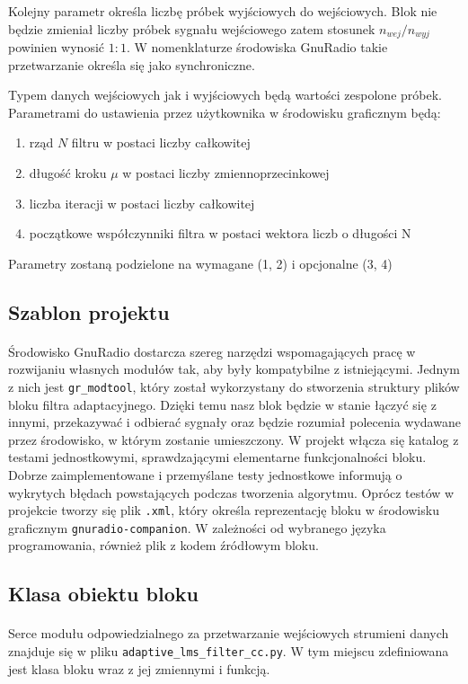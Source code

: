 Kolejny parametr określa liczbę próbek wyjściowych do wejściowych.
Blok nie będzie zmieniał liczby próbek sygnału wejściowego zatem stosunek $n_{wej}/n_{wyj}$
powinien wynosić $1:1$. W nomenklaturze środowiska GnuRadio takie przetwarzanie określa się jako synchroniczne.

Typem danych wejściowych jak i wyjściowych będą wartości zespolone próbek.
Parametrami do ustawienia przez użytkownika w środowisku graficznym będą:
\begin{enumerate}
 \item rząd $N$ filtru w postaci liczby całkowitej 
 \item długość kroku $\mu$ w postaci liczby zmiennoprzecinkowej
 \item liczba iteracji w postaci liczby całkowitej
 \item początkowe współczynniki filtra w postaci wektora liczb o długości N 
 \end{enumerate}
 
Parametry zostaną podzielone na wymagane (1, 2) i opcjonalne (3, 4)
\subsection{Szablon projektu}
\paragraph{}
Środowisko GnuRadio dostarcza szereg narzędzi wspomagających pracę w rozwijaniu własnych modułów tak, aby były kompatybilne z istniejącymi. 
Jednym z nich jest \texttt{gr\_modtool}, który został wykorzystany do stworzenia struktury plików bloku filtra adaptacyjnego. 
Dzięki temu nasz blok będzie w stanie łączyć się z innymi, przekazywać i odbierać sygnały oraz będzie rozumiał polecenia wydawane przez środowisko, w którym zostanie umieszczony. 
W projekt włącza się katalog z testami jednostkowymi, sprawdzającymi elementarne funkcjonalności bloku. 
Dobrze zaimplementowane i przemyślane testy jednostkowe informują o wykrytych błędach powstających podczas tworzenia algorytmu.
Oprócz testów w projekcie tworzy się plik \texttt{.xml}, który określa reprezentację bloku w środowisku graficznym \texttt{gnuradio-companion}. 
W zależności od wybranego języka programowania, również plik z kodem źródłowym bloku.
\subsection{Klasa obiektu bloku}
\paragraph{}
Serce modułu odpowiedzialnego za przetwarzanie wejściowych strumieni danych znajduje się w pliku  \texttt{adaptive\_lms\_filter\_cc.py}. W tym miejscu zdefiniowana jest klasa bloku wraz z jej zmiennymi i funkcją.

